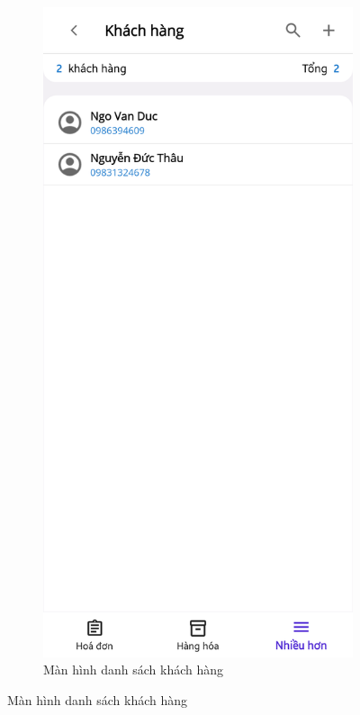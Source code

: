 \documentclass[../DoAn.tex]{subfiles}
\begin{document}
\begin{figure}[H]
    \begin{subfigure}{0.49\linewidth}
        \centering
        \includegraphics[width=0.9\linewidth]{Hinhve/design/screens/ClientListPage}
        \caption{Màn hình danh sách khách hàng}
        \label{figure:screen-clientlistpage}
    \end{subfigure}

\end{figure}
\end{document}
